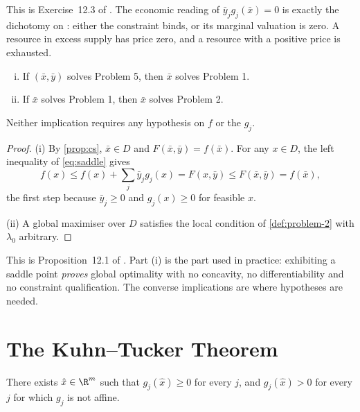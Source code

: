 This is Exercise~12.3 of \textcite{fukuda2026notes}
\autocite[slide 19]{fukuda2026optimization}. The economic reading of
$\bar y_jg_j(\bar x)=0$ is exactly the dichotomy on
\autocite[slide 16]{fukuda2026optimization}: either the constraint binds, or its
marginal valuation is zero. A resource in excess supply has price zero, and a
resource with a positive price is exhausted.

\begin{proposition}\label{prop:p5-p1-p2}
	\begin{enumerate}[(i)]
		\item If $(\bar x,\bar y)$ solves Problem 5, then $\bar x$ solves Problem 1.
		\item If $\bar x$ solves Problem 1, then $\bar x$ solves Problem 2.
	\end{enumerate}
	Neither implication requires any hypothesis on $f$ or the $g_j$.
\end{proposition}

\begin{proof}
	(i) By \autoref{prop:cs}, $\bar x\in D$ and $F(\bar x,\bar y)=f(\bar x)$. For
	any $x\in D$, the left inequality of \eqref{eq:saddle} gives
	\[
		f(x)\leq f(x)+\sum_j\bar y_jg_j(x)=F(x,\bar y)\leq F(\bar x,\bar y)=f(\bar x),
	\]
	the first step because $\bar y_j\geq0$ and $g_j(x)\geq0$ for feasible $x$.

	(ii) A global maximiser over $D$ satisfies the local condition of
	\autoref{def:problem-2} with $\lambda_0$ arbitrary.
\end{proof}

This is Proposition~12.1 of \textcite{fukuda2026notes}
\autocite[slide 19]{fukuda2026optimization}. Part (i) is the part used in
practice: exhibiting a saddle point \emph{proves} global optimality with no
concavity, no differentiability and no constraint qualification. The converse
implications are where hypotheses are needed.

\section{The Kuhn--Tucker Theorem}\label{sec:opt-kkt}

\begin{assumption}\label{ass:slater}
	There exists $\hat x\in\R^m$ such that $g_j(\hat x)\geq0$ for every $j$, and
	$g_j(\hat x)>0$ for every $j$ for which $g_j$ is not affine.
\end{assumption}

